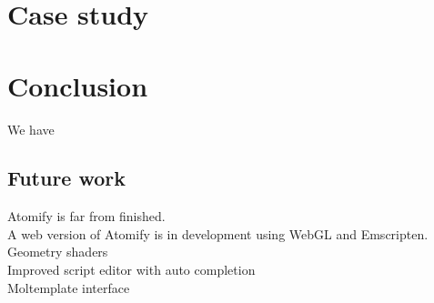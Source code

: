 \documentclass[aps,pre,twocolumn,letterpaper,floatfix]{revtex4}
\begin{document}
\section{Case study}


\section{Conclusion}
We have

\subsection{Future work}
Atomify is far from finished.\\
A web version of Atomify is in development using WebGL and Emscripten. \\
Geometry shaders \\
Improved script editor with auto completion \\
Moltemplate interface \\






\end{document}
